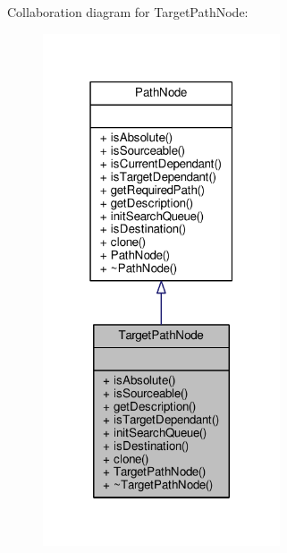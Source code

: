 Collaboration diagram for Target\+Path\+Node\+:
\nopagebreak
\begin{figure}[H]
\begin{center}
\leavevmode
\includegraphics[width=199pt]{df/d41/classTargetPathNode__coll__graph}
\end{center}
\end{figure}
